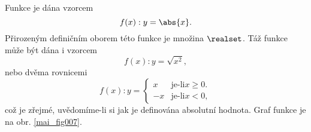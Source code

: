 \wikitextrule
\begin{example}\label{MAI:exam019} 
  Funkce je dána vzorcem 
  \begin{equation*}
    f(x):y=\abs{x}.
  \end{equation*} 
  Přirozeným definičním oborem této funkce je množina $\realset$. Táž funkce může být dána i 
  vzorcem
  \begin{equation*}
    f(x):y=\sqrt{x^2},
  \end{equation*}    
  nebo dvěma rovnicemi
  \begin{equation*}
    f(x):y=
       \begin{cases}
           x & \text{je-li} x \geq 0. \\
          -x & \text{je-li} x < 0,
       \end{cases}                 
  \end{equation*}  
  což je zřejmé, uvědomíme-li si jak je definována absolutní hodnota. Graf funkce je na obr. 
  \ref{mai_fig007}.
  
  {\centering
   \captionsetup{type=figure}
   
   \label{mai_fig007}
  \par}
\end{example}